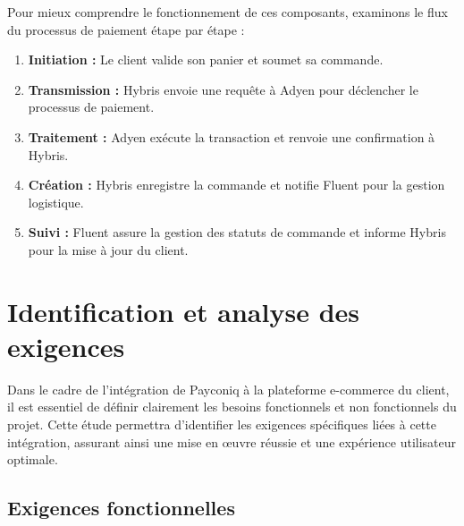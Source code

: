 Pour mieux comprendre le fonctionnement de ces composants, examinons le flux du processus de paiement étape par étape :
\begin{enumerate}
    \item \textbf{Initiation :} Le client valide son panier et soumet sa commande.
    \item \textbf{Transmission :} Hybris envoie une requête à Adyen pour déclencher le processus de paiement.
    \item \textbf{Traitement :} Adyen exécute la transaction et renvoie une confirmation à Hybris.
    \item \textbf{Création :} Hybris enregistre la commande et notifie Fluent pour la gestion logistique.
    \item \textbf{Suivi :} Fluent assure la gestion des statuts de commande et informe Hybris pour la mise à jour du client.
\end{enumerate}
\section{Identification et analyse des exigences}
Dans le cadre de l'intégration de Payconiq à la plateforme e-commerce du client, il est essentiel de définir clairement les besoins fonctionnels et non fonctionnels du projet. 
Cette étude permettra d'identifier les exigences spécifiques liées à cette intégration, assurant ainsi une mise en œuvre réussie et une expérience utilisateur optimale. 

\subsection{Exigences fonctionnelles}

